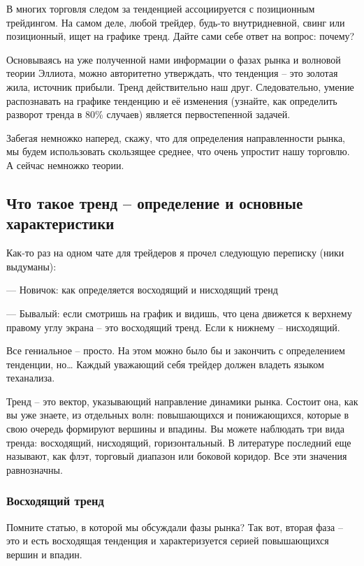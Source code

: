\documentclass{book}
\begin{document}
В многих торговля следом за тенденцией ассоциируется с позиционным трейдингом. На самом деле, любой трейдер, будь-то внутридневной, свинг или позиционный, ищет на графике тренд. Дайте сами себе ответ на вопрос: почему?

Основываясь на уже полученной нами информации о фазах рынка и волновой теории Эллиота, можно авторитетно утверждать, что тенденция – это золотая жила, источник прибыли. Тренд действительно наш друг. Следовательно, умение распознавать на графике тенденцию и её изменения (узнайте, как определить разворот тренда в 80\% случаев) является первостепенной задачей.

Забегая немножко наперед, скажу, что для определения направленности
рынка, мы будем использовать скользящее среднее, что очень упростит
нашу торговлю. А сейчас немножко теории.

\subsection{Что такое тренд – определение и основные характеристики}

Как-то раз на одном чате для трейдеров я прочел следующую переписку (ники выдуманы):

—  Новичок: как определяется восходящий и нисходящий тренд

—  Бывалый: если смотришь на график и видишь, что цена движется к верхнему правому углу экрана – это восходящий тренд. Если к нижнему – нисходящий.

Все гениальное – просто. На этом можно было бы и закончить с определением тенденции, но… Каждый уважающий себя трейдер должен владеть языком теханализа.

Тренд – это вектор, указывающий направление динамики рынка. Состоит
она, как вы уже знаете, из отдельных волн: повышающихся и
понижающихся, которые в свою очередь формируют вершины и впадины. Вы
можете наблюдать три вида тренда: восходящий, нисходящий,
горизонтальный. В литературе последний еще называют, как флэт,
торговый диапазон или боковой коридор. Все эти значения равнозначны.

\subsubsection{Восходящий тренд  }

Помните статью, в которой мы обсуждали фазы рынка? Так вот, вторая
фаза – это и есть восходящая тенденция и характеризуется серией
повышающихся вершин и впадин.
\end{document}
